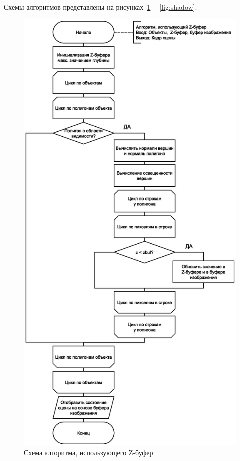 Схемы алгоритмов представлены на рисунках~\ref{fig:z}$-$~\ref{fig:shadow}.
\clearpage
\begin{figure}[h!]
    \centering
    \includegraphics[scale=0.65]{img/zbuf.eps}
    \caption{Схема алгоритма, использующего Z-буфер}
    \label{fig:z}
\end{figure}
